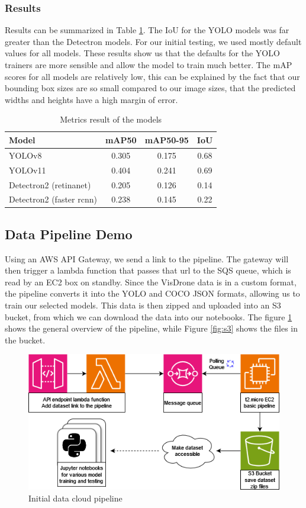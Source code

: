 \documentclass[stu,12pt,floatsintext]{apa7}
\begin{document}
\subsubsection{Results}
Results can be summarized in Table \ref{tab:results}. The IoU for the YOLO models was far greater than the Detectron models. For our initial testing, we used mostly default values for all models. These results show us that the defaults for the YOLO trainers are more sensible and allow the model to train much better. The mAP scores for all models are relatively low, this can be explained by the fact that our bounding box sizes are so small compared to our image sizes, that the predicted widths and heights have a high margin of error.

\begin{table}[H]
	\centering
	\begin{tabular}{lccc}
		\hline
		Model                    & mAP50 & mAP50-95 & IoU  \\
		\hline
		YOLOv8                   & 0.305 & 0.175    & 0.68 \\
		YOLOv11                  & 0.404 & 0.241    & 0.69 \\
		Detectron2 (retinanet)   & 0.205 & 0.126    & 0.14 \\
		Detectron2 (faster rcnn) & 0.238 & 0.145    & 0.22 \\
		\hline
	\end{tabular}
	\caption{Metrics result of the models}
	\label{tab:results}
\end{table}

\subsection{Data Pipeline Demo}

Using an AWS API Gateway, we send a link to the  pipeline. The gateway will then trigger a lambda function that passes that url to the SQS queue, which is read by an EC2 box on standby. Since the VisDrone data is in a custom format, the pipeline converts it into the YOLO and COCO JSON formats, allowing us to train our selected models. This data is then zipped and uploaded into an S3 bucket, from which we can download the data into our notebooks. The figure \ref{fig:aws-pipeline} shows the general overview of the pipeline, while Figure \ref{fig:s3} shows the files in the bucket.

\begin{figure}[!htb]
	\centering
	\includegraphics[width=0.5\linewidth]{images/AWS_diagram.png}
	\caption{Initial data cloud pipeline}
	\label{fig:aws-pipeline}
\end{figure}
\end{document}
